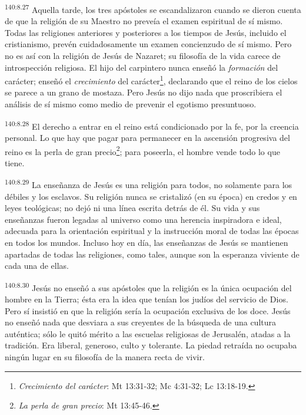 \par 
\textsuperscript{140:8.27} Aquella tarde, los tres apóstoles se escandalizaron cuando se dieron cuenta de que la religión de su Maestro no preveía el examen espiritual de sí mismo. Todas las religiones anteriores y posteriores a los tiempos de Jesús, incluido el cristianismo, prevén cuidadosamente un examen concienzudo de sí mismo. Pero no es así con la religión de Jesús de Nazaret; su filosofía de la vida carece de introspección religiosa. El hijo del carpintero nunca enseñó la \textit{formación} del carácter; enseñó el \textit{crecimiento} del carácter\footnote{\textit{Crecimiento del carácter}: Mt 13:31-32; Mc 4:31-32; Lc 13:18-19.}, declarando que el reino de los cielos se parece a un grano de mostaza. Pero Jesús no dijo nada que proscribiera el análisis de sí mismo como medio de prevenir el egotismo presuntuoso.

\par 
\textsuperscript{140:8.28} El derecho a entrar en el reino está condicionado por la fe, por la creencia personal. Lo que hay que pagar para permanecer en la ascensión progresiva del reino es la perla de gran precio\footnote{\textit{La perla de gran precio}: Mt 13:45-46.}; para poseerla, el hombre vende todo lo que tiene.

\par 
\textsuperscript{140:8.29} La enseñanza de Jesús es una religión para todos, no solamente para los débiles y los esclavos. Su religión nunca se cristalizó (en su época) en credos y en leyes teológicas; no dejó ni una línea escrita detrás de él. Su vida y sus enseñanzas fueron legadas al universo como una herencia inspiradora e ideal, adecuada para la orientación espiritual y la instrucción moral de todas las épocas en todos los mundos. Incluso hoy en día, las enseñanzas de Jesús se mantienen apartadas de todas las religiones, como tales, aunque son la esperanza viviente de cada una de ellas.

\par 
\textsuperscript{140:8.30} Jesús no enseñó a sus apóstoles que la religión es la única ocupación del hombre en la Tierra; ésta era la idea que tenían los judíos del servicio de Dios. Pero sí insistió en que la religión sería la ocupación exclusiva de los doce. Jesús no enseñó nada que desviara a sus creyentes de la búsqueda de una cultura auténtica; sólo le quitó mérito a las escuelas religiosas de Jerusalén, atadas a la tradición. Era liberal, generoso, culto y tolerante. La piedad retraída no ocupaba ningún lugar en su filosofía de la manera recta de vivir.


